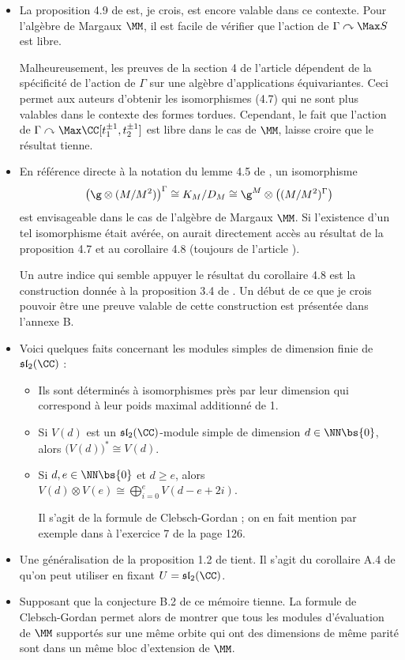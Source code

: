 \begin{itemize}
\item[\textbullet] La proposition 4.9 de \cite{NSext} est, je crois, est encore valable dans ce contexte. Pour l'algèbre de Margaux $\MM$, il est facile de vérifier que l'action de $\Gamma \curvearrowright \Max S$ est libre. 

Malheureusement, les preuves de la section 4 de l'article \cite{NSext} dépendent de la spécificité de l'action de $\Gamma$ sur une algèbre d'applications équivariantes. Ceci permet aux auteurs d'obtenir les isomorphismes (4.7) qui ne sont plus valables dans le contexte des formes tordues. Cependant, le fait que l'action de $\Gamma \curvearrowright \Max \CC[t_1^{\pm 1},t_2^{\pm 1}]$ est libre dans le cas de $\MM$, laisse croire que le résultat tienne.
\item[\textbullet] En référence directe à la notation du lemme 4.5 de \cite{NSext},  un isomorphisme
$$ \big(\g \otimes (M/M^2)\big)^\Gamma \cong K_M/D_M \cong \g^M \otimes \big((M/M^2)^\Gamma\big) $$
est envisageable dans le cas de l'algèbre de Margaux $\MM$. Si l'existence d'un tel isomorphisme était avérée, on aurait directement accès au résultat de la proposition 4.7 et au corollaire 4.8 (toujours de l'article \cite{NSext}).

Un autre indice qui semble appuyer le résultat du corollaire 4.8 est la construction donnée à la proposition 3.4 de \cite{CMspec}. Un début de ce que je crois pouvoir être une preuve valable de cette construction est présentée dans l'annexe B.
\item[\textbullet] Voici quelques faits concernant les modules simples de dimension finie de $\mathfrak{sl}_2(\CC)$ :
\begin{itemize}
\item[$\rightarrow$] Ils sont déterminés à isomorphismes près par leur dimension qui correspond à leur poids maximal additionné de 1. 
\item[$\rightarrow$] Si $V(d)$ est un $\mathfrak{sl}_2(\CC)$-module simple de dimension $d \in \NN \bs \{0\}$, alors $\big(V(d)\big)^* \cong V(d)$. 
\item[$\rightarrow$] Si $d, e \in \NN \bs \{0\}$ et $d \geq e$, alors $V(d) \otimes V(e) \cong \bigoplus_{i=0}^e V(d-e+2i)$. 

Il s'agit de la formule de Clebsch-Gordan ; on en fait mention par exemple dans \cite{Humphreys} à l'exercice 7 de la page 126.
\end{itemize}
\item[\textbullet] Une généralisation de la proposition 1.2 de \cite{CMspec} tient. Il s'agit du corollaire A.4 de \cite{NSext} qu'on peut utiliser en fixant $U = \mathfrak{sl}_2(\CC)$.
\item[\textbullet] Supposant que la conjecture B.2 de ce mémoire tienne. La formule de Clebsch-Gordan permet alors de montrer que tous les modules d'évaluation de $\MM$ supportés sur une même orbite qui ont des dimensions de même parité sont dans un même bloc d'extension de $\MM$.


\end{itemize}
